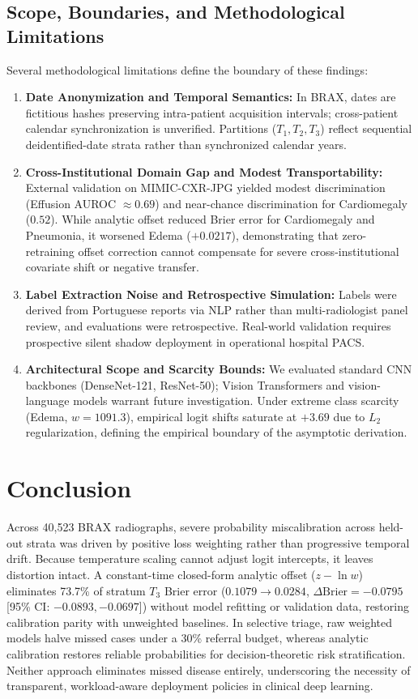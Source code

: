 \documentclass[preprint,12pt]{elsarticle}
\begin{document}
\subsection{Scope, Boundaries, and Methodological Limitations}
Several methodological limitations define the boundary of these findings:
\begin{enumerate}
    \item \textbf{Date Anonymization and Temporal Semantics:} In BRAX, dates are fictitious hashes preserving intra-patient acquisition intervals; cross-patient calendar synchronization is unverified. Partitions ($T_1, T_2, T_3$) reflect sequential deidentified-date strata rather than synchronized calendar years.
    \item \textbf{Cross-Institutional Domain Gap and Modest Transportability:} External validation on MIMIC-CXR-JPG yielded modest discrimination (Effusion AUROC $\approx 0.69$) and near-chance discrimination for Cardiomegaly ($0.52$). While analytic offset reduced Brier error for Cardiomegaly and Pneumonia, it worsened Edema ($+0.0217$), demonstrating that zero-retraining offset correction cannot compensate for severe cross-institutional covariate shift or negative transfer.
    \item \textbf{Label Extraction Noise and Retrospective Simulation:} Labels were derived from Portuguese reports via NLP rather than multi-radiologist panel review, and evaluations were retrospective. Real-world validation requires prospective silent shadow deployment in operational hospital PACS.
    \item \textbf{Architectural Scope and Scarcity Bounds:} We evaluated standard CNN backbones (DenseNet-121, ResNet-50); Vision Transformers and vision-language models warrant future investigation. Under extreme class scarcity (Edema, $w = 1091.3$), empirical logit shifts saturate at $+3.69$ due to $L_2$ regularization, defining the empirical boundary of the asymptotic derivation.
\end{enumerate}

\section{Conclusion}
Across 40,523 BRAX radiographs, severe probability miscalibration across held-out strata was driven by positive loss weighting rather than progressive temporal drift. Because temperature scaling cannot adjust logit intercepts, it leaves distortion intact. A constant-time closed-form analytic offset ($z - \ln w$) eliminates 73.7\% of stratum $T_3$ Brier error ($0.1079 \to 0.0284$, $\Delta\text{Brier} = -0.0795$ [95\% CI: $-0.0893, -0.0697$]) without model refitting or validation data, restoring calibration parity with unweighted baselines. In selective triage, raw weighted models halve missed cases under a 30\% referral budget, whereas analytic calibration restores reliable probabilities for decision-theoretic risk stratification. Neither approach eliminates missed disease entirely, underscoring the necessity of transparent, workload-aware deployment policies in clinical deep learning.
\end{document}
